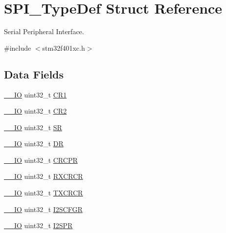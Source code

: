 \hypertarget{struct_s_p_i___type_def}{}\section{S\+P\+I\+\_\+\+Type\+Def Struct Reference}
\label{struct_s_p_i___type_def}


Serial Peripheral Interface.  




{\ttfamily \#include $<$stm32f401xc.\+h$>$}

\subsection*{Data Fields}
\begin{DoxyCompactItemize}
\item 
\hyperlink{core__sc300_8h_aec43007d9998a0a0e01faede4133d6be}{\+\_\+\+\_\+\+IO} uint32\+\_\+t \hyperlink{struct_s_p_i___type_def_ab0ec7102960640751d44e92ddac994f0}{C\+R1}
\item 
\hyperlink{core__sc300_8h_aec43007d9998a0a0e01faede4133d6be}{\+\_\+\+\_\+\+IO} uint32\+\_\+t \hyperlink{struct_s_p_i___type_def_afdfa307571967afb1d97943e982b6586}{C\+R2}
\item 
\hyperlink{core__sc300_8h_aec43007d9998a0a0e01faede4133d6be}{\+\_\+\+\_\+\+IO} uint32\+\_\+t \hyperlink{struct_s_p_i___type_def_af6aca2bbd40c0fb6df7c3aebe224a360}{SR}
\item 
\hyperlink{core__sc300_8h_aec43007d9998a0a0e01faede4133d6be}{\+\_\+\+\_\+\+IO} uint32\+\_\+t \hyperlink{struct_s_p_i___type_def_a3df0d8dfcd1ec958659ffe21eb64fa94}{DR}
\item 
\hyperlink{core__sc300_8h_aec43007d9998a0a0e01faede4133d6be}{\+\_\+\+\_\+\+IO} uint32\+\_\+t \hyperlink{struct_s_p_i___type_def_ace450027b4b33f921dd8edd3425a717c}{C\+R\+C\+PR}
\item 
\hyperlink{core__sc300_8h_aec43007d9998a0a0e01faede4133d6be}{\+\_\+\+\_\+\+IO} uint32\+\_\+t \hyperlink{struct_s_p_i___type_def_a2cf9dcd9008924334f20f0dc6b57042e}{R\+X\+C\+R\+CR}
\item 
\hyperlink{core__sc300_8h_aec43007d9998a0a0e01faede4133d6be}{\+\_\+\+\_\+\+IO} uint32\+\_\+t \hyperlink{struct_s_p_i___type_def_ab4e4328504fd66285df8264d410deefd}{T\+X\+C\+R\+CR}
\item 
\hyperlink{core__sc300_8h_aec43007d9998a0a0e01faede4133d6be}{\+\_\+\+\_\+\+IO} uint32\+\_\+t \hyperlink{struct_s_p_i___type_def_aa0c41c8883cb0812d6aaf956c393584b}{I2\+S\+C\+F\+GR}
\item 
\hyperlink{core__sc300_8h_aec43007d9998a0a0e01faede4133d6be}{\+\_\+\+\_\+\+IO} uint32\+\_\+t \hyperlink{struct_s_p_i___type_def_ab9be89a916ee5904381e10da10e5e8e9}{I2\+S\+PR}
\end{DoxyCompactItemize}


